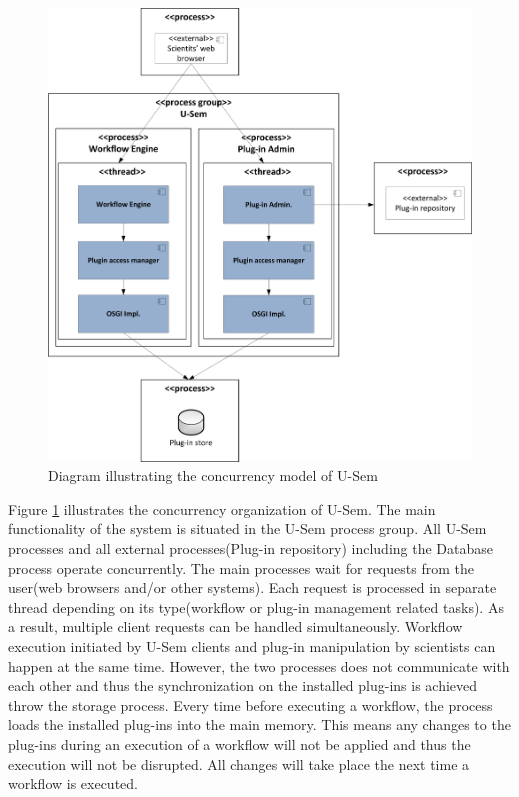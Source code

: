 \begin{figure}[h!]
  \centering
  	\includegraphics[scale=0.70]{plug-in/layers/concur.png}
  \caption{Diagram illustrating the concurrency model of U-Sem}
  \label{fig_conc}
\end{figure}

Figure \ref{fig_conc} illustrates the concurrency organization of U-Sem. The main functionality of the system is situated in the U-Sem process group. All U-Sem processes and all external processes(Plug-in repository) including the Database process operate concurrently. The main processes wait for requests from the user(web browsers and/or other systems). Each request is processed in separate thread depending on its type(workflow or plug-in management related tasks). As a result, multiple client requests can be handled simultaneously. Workflow execution initiated by U-Sem clients and plug-in manipulation by scientists can happen at the same time. However, the two processes does not communicate with each other and thus the synchronization on the installed plug-ins is achieved throw the storage process. Every time before executing a workflow, the process loads the installed plug-ins into the main memory. This means any changes to the plug-ins during an execution of a workflow will not be applied and thus the execution will not be disrupted. All changes will take place the next time a workflow is executed.

